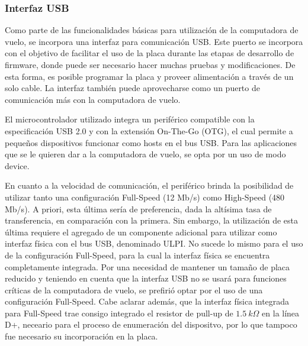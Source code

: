 

\subsubsection{Interfaz USB}

Como parte de las funcionalidades básicas para utilización de la computadora de vuelo, se incorpora una interfaz para comunicación USB. Este puerto se incorpora con el objetivo de facilitar el uso de la placa durante las etapas de desarrollo de firmware, donde puede ser necesario hacer muchas pruebas y modificaciones. De esta forma, es posible programar la placa y proveer alimentación a través de un solo cable. La interfaz también puede aprovecharse como un puerto de comunicación más con la computadora de vuelo.

El microcontrolador utilizado integra un periférico compatible con la especificación USB 2.0 y con la extensión On-The-Go (OTG), el cual permite a pequeños dispositivos funcionar como hosts en el bus USB. Para las aplicaciones que se le quieren dar a la computadora de vuelo, se opta por un uso de modo device. 

En cuanto a la velocidad de comunicación, el periférico brinda la posibilidad de utilizar tanto una configuración Full-Speed (12 Mb/s) como High-Speed (480 Mb/s). A priori, esta última sería de preferencia, dada la altísima tasa de transferencia, en comparación con la primera. Sin embargo, la utilización de esta última requiere el agregado de un componente adicional para utilizar como interfaz física con el bus USB, denominado ULPI. No sucede lo mismo para el uso de la configuración Full-Speed, para la cual la interfaz física se encuentra completamente integrada. Por una necesidad de mantener un tamaño de placa reducido y teniendo en cuenta que la interfaz USB no se usará para funciones críticas de la computadora de vuelo, se prefirió optar por el uso de una configuración Full-Speed. Cabe aclarar además, que la interfaz física integrada para Full-Speed trae consigo integrado el resistor de pull-up de $1.5 \ k\Omega$ en la línea D+, neceario para el proceso de enumeración del dispositvo, por lo que tampoco fue necesario su incorporación en la placa.

